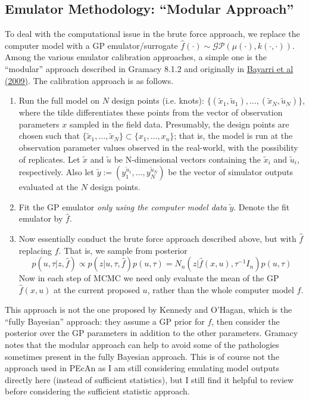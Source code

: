 \documentclass[12pt]{article}
\begin{document}
\subsection{Emulator Methodology: ``Modular Approach''}
To deal with the computational issue in the brute force approach, we replace the computer model with a GP emulator/surrogate $\hat{f}(\cdot) \sim \mathcal{GP}(\mu(\cdot), k(\cdot, \cdot))$. 
Among the various emulator calibration approaches, a simple one is the ``modular'' approach described in Gramacy 8.1.2 and originally in 
\href{https://projecteuclid.org/journals/bayesian-analysis/volume-4/issue-1/Modularization-in-Bayesian-analysis-with-emphasis-on-analysis-of-computer/10.1214/09-BA404.full}{Bayarri et al (2009)}. 
The calibration approach is as follows. 
\begin{enumerate}
\item Run the full model on $N$ design points (i.e. knots): $\{(\tilde{x}_1, \tilde{u}_1), \dots, (\tilde{x}_N, \tilde{u}_N)\}$, where the tilde differentiates these points from the vector of observation parameters $x$
sampled in the field data. Presumably, the design points are chosen such that $\{\tilde{x}_1, \dots, \tilde{x}_N\} \subset \{x_1, \dots, x_n\}$; that is, the model is run at the observation parameter
values observed in the real-world, with the possibility of replicates. Let $\tilde{x}$ and $\tilde{u}$ be N-dimensional vectors containing the 
$\tilde{x}_i$ and $\tilde{u}_i$, respectively. Also let $\tilde{y} := (y_1^{\tilde{u}_1}, \dots, y_N^{\tilde{u}_N})$ be the vector of simulator outputs evaluated at the $N$ design points. 
\item Fit the GP emulator \textit{only using the computer model data} $\tilde{y}$. Denote the fit emulator by $\hat{f}$. 
\item Now essentially conduct the brute force approach described above, but with $\hat{f}$ replacing $f$. That is, we sample from posterior
\[p(u, \tau|z, \hat{f}) \propto p(z|u, \tau, \hat{f})p(u, \tau) = N_n(z|\hat{f}(x, u), \tau^{-1} I_n)p(u, \tau)\]
Now in each step of MCMC we need only evaluate the mean of the GP $\hat{f}(x, u)$ at the current proposed $u$, rather than the whole computer model $f$. 
\end{enumerate}
This approach is not the one proposed by Kennedy and O'Hagan, which is the ``fully Bayesian'' approach: they assume a GP prior for $f$, then consider the posterior over the GP parameters
in addition to the other parameters. Gramacy notes that the modular approach can help to avoid some of the pathologies sometimes present in the fully Bayesian approach. This is of course not
the approach used in PEcAn as I am still considering emulating model outputs directly here (instead of sufficient statistics), but I still find it helpful to review before considering the sufficient 
statistic approach. 
\end{document}
